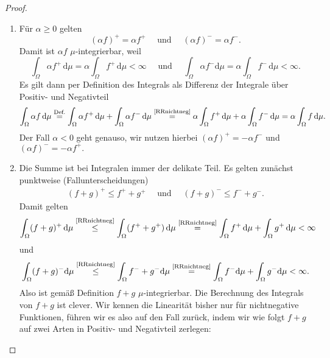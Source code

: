 \begin{proof}\abs 
	\begin{enumerate}[label=(\roman*)]
		\item 
			 F\"ur $\alpha \geq 0$ gelten $$(\alpha f)^+ = \alpha f^+\quad \text{ und }\quad 
				(\alpha f)^- = \alpha f^-.$$
			Damit ist $\alpha f$ $\mu$-integrierbar, weil 
			\[ \int_{\Omega} \alpha f^+\, \mathrm{d}\mu = \alpha \int_{\Omega} f^+ \,\mathrm{d}\mu < \infty\quad \text{ und }\quad \int_{\Omega} \alpha f^- \mathrm{d}\mu = \alpha \int_{\Omega} f^-\, \mathrm{d}\mu < \infty. \]
			Es gilt dann per Definition des Integrals als Differenz der Integrale \"uber Positiv- und Negativteil
			\begin{gather*}
				\int_{\Omega} \alpha f \,\mathrm{d}\mu \overset{\text{Def.}}{=} \int_{\Omega} \alpha f^+ \,\mathrm{d}\mu + \int_{\Omega} \alpha f^-\, \mathrm{d}\mu
				\overset{\text{\ref{RRnichtneg}}}{=} \alpha \int_{\Omega} f^+\, \mathrm{d}\mu + \alpha \int_{\Omega} f^-\, \mathrm{d}\mu =\alpha \int_{\Omega} f \,\mathrm{d}\mu.\\
			\end{gather*}
			Der Fall $\alpha <0$ geht genauso, wir nutzen hierbei $(\alpha f)^+ = -\alpha f^-$ und $(\alpha f)^- = -\alpha f^+.$
		\item Die Summe ist bei Integralen immer der delikate Teil. Es gelten zun\"achst punktweise (Fallunterscheidungen)
		\begin{align*}
			(f+g)^+ \leq f^+ + g^+\quad \text{ und }\quad (f+g)^- \leq f^- + g^-.
		\end{align*}	
		 Damit gelten 
		\begin{align*}
		\int_{\Omega} (f + g)^+ \,\mathrm{d}\mu \overset{\text{\ref{RRnichtneg}}}{\leq} \int_{\Omega} (f^+ + g^+)\,\mathrm{d}\mu \overset{\text{\ref{RRnichtneg}}}{=} \int_{\Omega} f^+\, \mathrm{d}\mu + \int_{\Omega} g^+ \,\mathrm{d}\mu < \infty
		\end{align*}
		und
		\begin{align*}
		\int_{\Omega} (f + g)^- \mathrm{d}\mu \overset{\text{\ref{RRnichtneg}}}{\leq} \int_{\Omega} f^- + g^- \mathrm{d}\mu \overset{\text{\ref{RRnichtneg}}}{=} \int_{\Omega} f^- \mathrm{d}\mu + \int_{\Omega} g^- \mathrm{d}\mu < \infty.
		\end{align*}
		Also ist gem\"a\ss{} Definition $f + g$ $\mu$-integrierbar. Die Berechnung des Integrals von $f+g$ ist clever. Wir kennen die Linearit\"at bisher nur f\"ur nichtnegative Funktionen, f\"uhren wir es also auf den Fall zur\"uck, indem wir wie folgt $f+g$ auf zwei Arten in Positiv- und Negativteil zerlegen:

\end{enumerate}
\end{proof}
